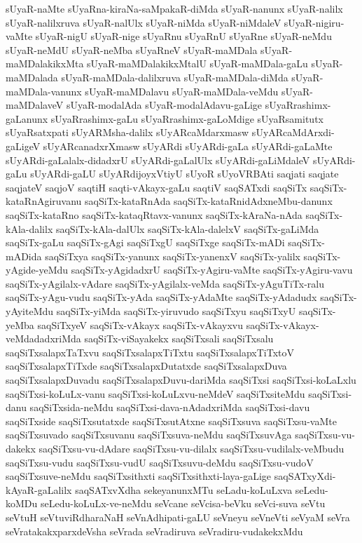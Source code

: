 {sUyaR-naMte
sUyaRna-kiraNa-saMpakaR-diMda
sUyaR-nanunx
sUyaR-nalilx
sUyaR-nalilxruva
sUyaR-nalUlx
sUyaR-niMda
sUyaR-niMdaleV
sUyaR-nigiru-vaMte
sUyaR-nigU
sUyaR-nige
sUyaRnu
sUyaRnU
sUyaRne
sUyaR-neMdu
sUyaR-neMdU
sUyaR-neMba
sUyaRneV
sUyaR-maMDala
sUyaR-maMDalakikxMta
sUyaR-maMDalakikxMtalU
sUyaR-maMDala-gaLu
sUyaR-maMDalada
sUyaR-maMDala-dalilxruva
sUyaR-maMDala-diMda
sUyaR-maMDala-vanunx
sUyaR-maMDalavu
sUyaR-maMDala-veMdu
sUyaR-maMDalaveV
sUyaR-modalAda
sUyaR-modalAdavu-gaLige
sUyaRrashimx-gaLanunx
sUyaRrashimx-gaLu
sUyaRrashimx-gaLoMdige
sUyaRsamitutx
sUyaRsatxpati
sUyARMsha-dalilx
sUyARcaMdarxmasw
sUyARcaMdArxdi-gaLigeV
sUyARcanadxrXmasw
sUyARdi
sUyARdi-gaLa
sUyARdi-gaLaMte
sUyARdi-gaLalalx-didadxrU
sUyARdi-gaLalUlx
sUyARdi-gaLiMdaleV
sUyARdi-gaLu
sUyARdi-gaLU
sUyARdijoyxVtiyU
sUyoR
sUyoVRBAti
saqjati
saqjate
saqjateV
saqjoV
saqtiH
saqti-vAkayx-gaLu
saqtiV
saqSATxdi
saqSiTx
saqSiTx-kataRnAgiruvanu
saqSiTx-kataRnAda
saqSiTx-kataRnidAdxneMbu-danunx
saqSiTx-kataRno
saqSiTx-kataqRtavx-vanunx
saqSiTx-kAraNa-nAda
saqSiTx-kAla-dalilx
saqSiTx-kAla-dalUlx
saqSiTx-kAla-dalelxV
saqSiTx-gaLiMda
saqSiTx-gaLu
saqSiTx-gAgi
saqSiTxgU
saqSiTxge
saqSiTx-mADi
saqSiTx-mADida
saqSiTxya
saqSiTx-yanunx
saqSiTx-yanenxV
saqSiTx-yalilx
saqSiTx-yAgide-yeMdu
saqSiTx-yAgidadxrU
saqSiTx-yAgiru-vaMte
saqSiTx-yAgiru-vavu
saqSiTx-yAgilalx-vAdare
saqSiTx-yAgilalx-veMda
saqSiTx-yAguTiTx-ralu
saqSiTx-yAgu-vudu
saqSiTx-yAda
saqSiTx-yAdaMte
saqSiTx-yAdadudx
saqSiTx-yAyiteMdu
saqSiTx-yiMda
saqSiTx-yiruvudo
saqSiTxyu
saqSiTxyU
saqSiTx-yeMba
saqSiTxyeV
saqSiTx-vAkayx
saqSiTx-vAkayxvu
saqSiTx-vAkayx-veMdadadxriMda
saqSiTx-viSayakekx
saqSiTxsali
saqSiTxsalu
saqSiTxsalapxTaTxvu
saqSiTxsalapxTiTxtu
saqSiTxsalapxTiTxtoV
saqSiTxsalapxTiTxde
saqSiTxsalapxDutatxde
saqSiTxsalapxDuva
saqSiTxsalapxDuvadu
saqSiTxsalapxDuvu-dariMda
saqSiTxsi
saqSiTxsi-koLaLxlu
saqSiTxsi-koLuLx-vanu
saqSiTxsi-koLuLxvu-neMdeV
saqSiTxsiteMdu
saqSiTxsi-danu
saqSiTxsida-neMdu
saqSiTxsi-dava-nAdadxriMda
saqSiTxsi-davu
saqSiTxside
saqSiTxsutatxde
saqSiTxsutAtxne
saqSiTxsuva
saqSiTxsu-vaMte
saqSiTxsuvado
saqSiTxsuvanu
saqSiTxsuva-neMdu
saqSiTxsuvAga
saqSiTxsu-vu-dakekx
saqSiTxsu-vu-dAdare
saqSiTxsu-vu-dilalx
saqSiTxsu-vudilalx-veMbudu
saqSiTxsu-vudu
saqSiTxsu-vudU
saqSiTxsuvu-deMdu
saqSiTxsu-vudoV
saqSiTxsuve-neMdu
saqSiTxsithxti
saqSiTxsithxti-laya-gaLige
saqSATxyXdi-kAyaR-gaLalilx
saqSATxvXdha
sekeyanunxMTu
seLadu-koLuLxva
seLedu-koMDu
seLedu-koLuLx-ve-neMdu
seVcane
seVcisa-beVku
seVci-suva
seVtu
seVtuH
seVtuviRdharaNaH
seVnAdhipati-gaLU
seVneyu
seVneVti
seVyaM
seVra
seVratakakxparxdeVsha
seVrada
seVradiruva
seVradiru-vudakekxMdu
}
